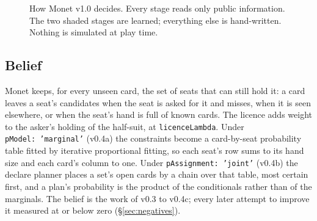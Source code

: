 \documentclass[11pt]{article}
\newcommand{\code}[1]{\texttt{#1}}
\newcommand{\sect}[1]{\S#1}
\begin{document}
\begin{figure}[t]
\centering
{}
\caption{How Monet v1.0 decides. Every stage reads only public information. The two shaded stages are
learned; everything else is hand-written. Nothing is simulated at play time.}
\label{fig:pipeline}
\end{figure}

\subsection{Belief}

Monet keeps, for every unseen card, the set of seats that can still hold it: a card leaves a seat's
candidates when the seat is asked for it and misses, when it is seen elsewhere, or when the seat's hand
is full of known cards. The licence adds weight to the asker's holding of the half-suit, at
\code{licenceLambda}. Under \code{pModel:~'marginal'} (v0.4a) the constraints become a card-by-seat
probability table fitted by iterative proportional fitting, so each seat's row sums to its hand size and
each card's column to one. Under \code{pAssignment:~'joint'} (v0.4b) the declare planner places a set's
open cards by a chain over that table, most certain first, and a plan's probability is the product of
the conditionals rather than of the marginals. The belief is the work of v0.3 to v0.4c; every later
attempt to improve it measured at or below zero (\sect\ref{sec:negatives}).
\end{document}
